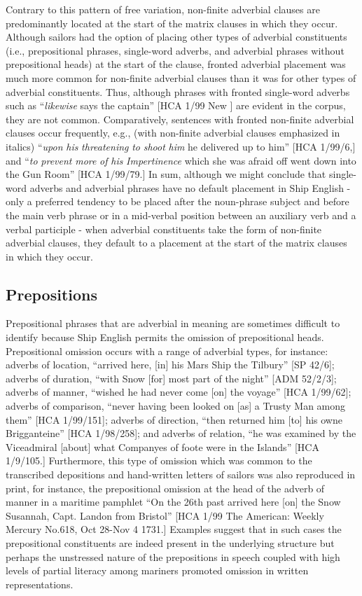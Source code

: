 Contrary to this pattern of free variation, non-finite adverbial clauses are predominantly located at the start of the matrix clauses in which they occur. Although sailors had the option of placing other types of adverbial constituents (i.e., prepositional phrases, single-word adverbs, and adverbial phrases without prepositional heads) at the start of the clause, fronted adverbial placement was much more common for non-finite adverbial clauses than it was for other types of adverbial constituents. Thus, although phrases with fronted single-word adverbs such as “\textit{likewise} says the captain” [HCA 1/99 New \citealt{Providence1722}] are evident in the corpus, they are not common. Comparatively, sentences with fronted non-finite adverbial clauses occur frequently, e.g., (with non-finite adverbial clauses emphasized in italics) “\textit{upon} \textit{his} \textit{threatening} \textit{to} \textit{shoot} \textit{him} he delivered up to him” [HCA 1/99/6,] and “\textit{to} \textit{prevent} \textit{more} \textit{of} \textit{his} \textit{Impertinence} which she was afraid off went down into the Gun Room” [HCA 1/99/79.] In sum, although we might conclude that single-word adverbs and adverbial phrases have no default placement in Ship English - only a preferred tendency to be placed after the noun-phrase subject and before the main verb phrase or in a mid-verbal position between an auxiliary verb and a verbal participle - when adverbial constituents take the form of non-finite adverbial clauses, they default to a placement at the start of the matrix clauses in which they occur. 

\subsection{\textbf{Prepositions} }%

Prepositional phrases that are adverbial in meaning are sometimes difficult to identify because Ship English permits the omission of prepositional heads. Prepositional omission occurs with a range of adverbial types, for instance: adverbs of location, “arrived here, [in] his Mars Ship the Tilbury” [SP 42/6]; adverbs of duration, “with Snow [for] most part of the night” [ADM 52/2/3]; adverbs of manner, “wished he had never come [on] the voyage” [HCA 1/99/62]; adverbs of comparison, “never having been looked on [as] a Trusty Man among them” [HCA 1/99/151]; adverbs of direction, “then returned him [to] his owne Brigganteine” [HCA 1/98/258]; and adverbs of relation, “he was examined by the Viceadmiral [about] what Companyes of foote were in the Islands” [HCA 1/9/105.] Furthermore, this type of omission which was common to the transcribed depositions and hand-written letters of sailors was also reproduced in print, for instance, the prepositional omission at the head of the adverb of manner in a maritime pamphlet “On the 26th past arrived here [on] the Snow Susannah, Capt. Landon from Bristol” [HCA 1/99 The American: Weekly Mercury No.618, Oct 28-Nov 4 1731.] Examples suggest that in such cases the prepositional constituents are indeed present in the underlying structure but perhaps the unstressed nature of the prepositions in speech coupled with high levels of partial literacy among mariners promoted omission in written representations. 

